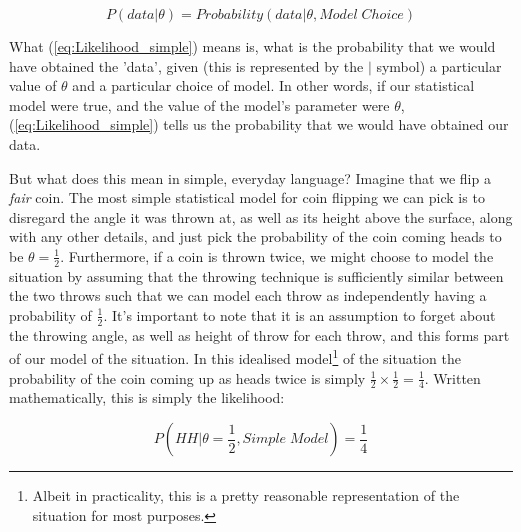 \documentclass[11pt,fullpage]{book}
\begin{document}
\begin{equation}
P(data|\theta) = Probability(data|\theta,Model \; Choice)
\end{equation}\label{eq:Likelihood_simple}

What (\ref{eq:Likelihood_simple}) means is, what is the probability that we would have obtained the 'data', given (this is represented by the $|$ symbol) a particular value of $\theta$ and a particular choice of model. In other words, if our statistical model were true, and the value of the model's parameter were $\theta$, (\ref{eq:Likelihood_simple}) tells us the probability that we would have obtained our data. 

But what does this mean in simple, everyday language? Imagine that we flip a \textit{fair} coin. The most simple statistical model for coin flipping we can pick is to disregard the angle it was thrown at, as well as its height above the surface, along with any other details, and just pick the probability of the coin coming heads to be $\theta=\frac{1}{2}$. Furthermore, if a coin is thrown twice, we might choose to model the situation by assuming that the throwing technique is sufficiently similar between the two throws such that we can model each throw as independently having a probability of $\frac{1}{2}$. It's important to note that it is an assumption to forget about the throwing angle, as well as height of throw for each throw, and this forms part of our model of the situation. In this idealised model\footnote{Albeit in practicality, this is a pretty reasonable representation of the situation for most purposes.} of the situation the probability of the coin coming up as heads twice is simply $\frac{1}{2}\times\frac{1}{2}=\frac{1}{4}$. Written mathematically, this is simply the likelihood:

\begin{equation}
P(HH|\theta=\frac{1}{2},Simple\;Model) = \frac{1}{4}
\end{equation}\label{eq:Likelihood_fairCoin}
\end{document}

